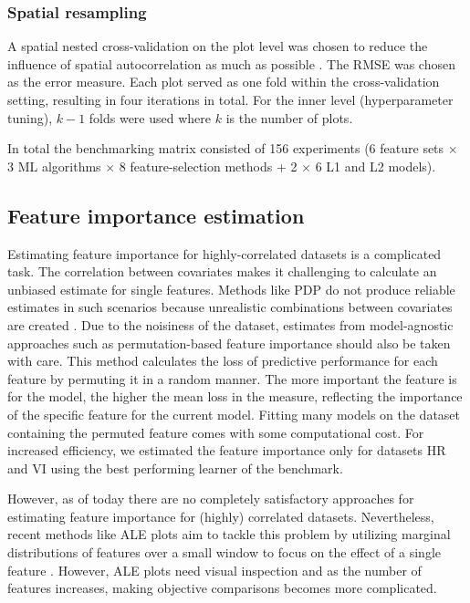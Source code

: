 \documentclass[letterpaper, peerreview]{IEEEtran}
\begin{document}
\subsubsection{Spatial resampling}

\noindent A spatial nested cross-validation on the plot level was chosen to reduce the influence of spatial autocorrelation as much as possible \cite{schratz2019, sperrorest}.
The \ac{RMSE} was chosen as the error measure.
Each plot served as one fold within the cross-validation setting, resulting in four iterations in total.
For the inner level (hyperparameter tuning), \(k - 1\) folds were used where \(k\) is the number of plots.

In total the benchmarking matrix consisted of 156 experiments (6 feature sets $\times$ 3 ML algorithms $\times$ 8 feature-selection methods + 2 $\times$ 6 L1 and L2 models).

\subsection{Feature importance estimation}

\noindent Estimating feature importance for highly-correlated datasets is a complicated task.
The correlation between covariates makes it challenging to calculate an unbiased estimate for single features.
Methods like \ac{PDP} do not produce reliable estimates in such scenarios because unrealistic combinations between covariates are created \cite{molnar2019}.
Due to the noisiness of the dataset, estimates from model-agnostic approaches such as permutation-based feature importance should also be taken with care.
This method calculates the loss of predictive performance for each feature by permuting it in a random manner.
The more important the feature is for the model, the higher the mean loss in the measure, reflecting the importance of the specific feature for the current model.
Fitting many models on the dataset containing the permuted feature comes with some computational cost.
For increased efficiency, we estimated the feature importance only for datasets HR and VI using the best performing learner of the benchmark.

However, as of today there are no completely satisfactory approaches for estimating feature importance for (highly) correlated datasets.
Nevertheless, recent methods like \ac{ALE} plots aim to tackle this problem by utilizing marginal distributions of features over a small window to focus on the effect of a single feature \cite{apley2019, molnar2019}.
However, ALE plots need visual inspection and as the number of features increases, making objective comparisons becomes more complicated.
\end{document}
